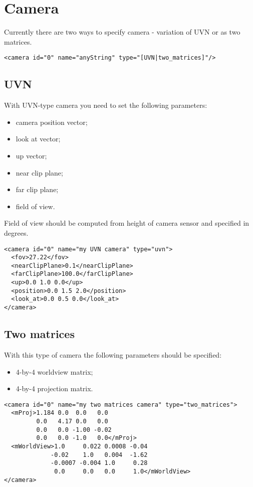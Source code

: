 \documentclass[a4paper,11pt]{report}
\begin{document}
\section{Camera}

Currently there are two ways to specify camera - variation of UVN or as two matrices.

\begin{lstlisting}
<camera id="0" name="anyString" type="[UVN|two_matrices]"/>
\end{lstlisting}

\subsection{UVN}
With UVN-type camera you need to set the following parameters:
\begin{itemize}
\item camera position vector;
\item look at vector;
\item up vector;
\item near clip plane;
\item far clip plane;
\item field of view.
\end{itemize}

Field of view should be computed from height of camera sensor and specified in degrees.
 
\lstset{language=XML}
\begin{lstlisting}
<camera id="0" name="my UVN camera" type="uvn">
  <fov>27.22</fov>
  <nearClipPlane>0.1</nearClipPlane>
  <farClipPlane>100.0</farClipPlane>
  <up>0.0 1.0 0.0</up>
  <position>0.0 1.5 2.0</position>
  <look_at>0.0 0.5 0.0</look_at>
</camera>
\end{lstlisting}

\subsection{Two matrices}

With this type of camera the following parameters should be specified:
\begin{itemize}
\item 4-by-4 worldview matrix;
\item 4-by-4 projection matrix.
\end{itemize}

\lstset{language=XML}
\begin{lstlisting}
<camera id="0" name="my two matrices camera" type="two_matrices">
  <mProj>1.184 0.0  0.0   0.0
         0.0   4.17 0.0   0.0
         0.0   0.0 -1.00 -0.02
         0.0   0.0 -1.0   0.0</mProj>
  <mWorldView>1.0     0.022 0.0008 -0.04
             -0.02    1.0   0.004  -1.62
             -0.0007 -0.004 1.0     0.28
              0.0     0.0   0.0     1.0</mWorldView>
</camera>
\end{lstlisting}
\end{document}
